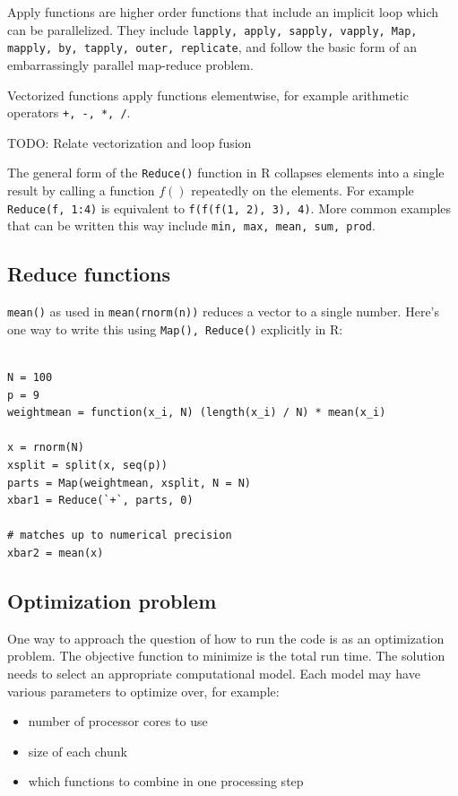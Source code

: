 \documentclass[12pt]{article}
\begin{document}
Apply functions are higher order functions that include an implicit loop
which can be parallelized. They include \texttt{lapply, apply, sapply,
vapply, Map, mapply, by, tapply, outer, replicate}, and follow the basic
form of an embarrassingly parallel map-reduce problem.

Vectorized functions apply functions elementwise, for example arithmetic
operators \texttt{+, -, *, /}.

TODO: Relate vectorization and loop fusion

The general form of the \texttt{Reduce()} function in R collapses elements
into a single result by calling a function $f()$ repeatedly on the
elements. For example \texttt{Reduce(f, 1:4)} is equivalent to 
\texttt{f(f(f(1, 2), 3), 4)}. More common examples that can be written this
way include \texttt{min, max, mean, sum, prod}.

\subsection{Reduce functions}

\texttt{mean()} as used in \texttt{mean(rnorm(n))} reduces a vector to a
single number. Here's one way to write this using \texttt{Map(), Reduce()}
explicitly in R:

\begin{verbatim}

N = 100
p = 9
weightmean = function(x_i, N) (length(x_i) / N) * mean(x_i)

x = rnorm(N)
xsplit = split(x, seq(p))
parts = Map(weightmean, xsplit, N = N)
xbar1 = Reduce(`+`, parts, 0)

# matches up to numerical precision
xbar2 = mean(x)

\end{verbatim}

\subsection{Optimization problem}

One way to approach the question of how to run the code is as an
optimization problem. The objective function to minimize is the total run
time. The solution needs to select an appropriate computational model. Each
model may have various parameters to optimize over, for example:

\begin{itemize}
    \item number of processor cores to use
    \item size of each chunk
    \item which functions to combine in one processing step
\end{itemize}
\end{document}

